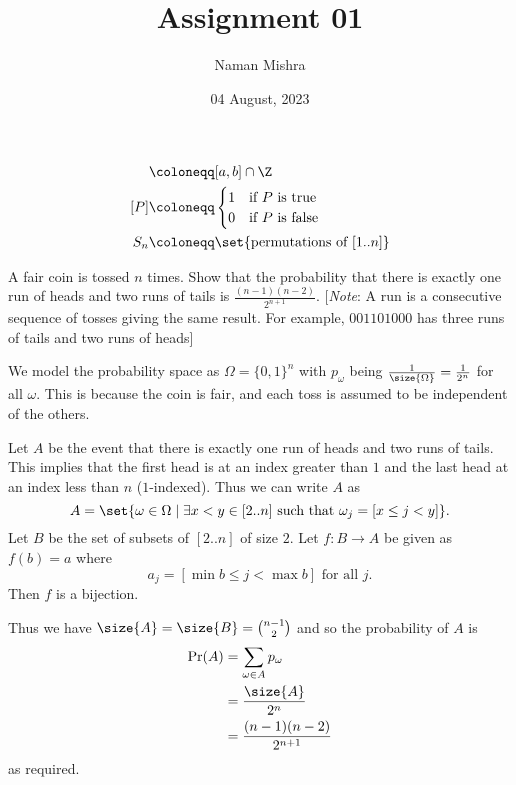 \documentclass[12pt]{article}
\title{Assignment 01}
\author{Naman Mishra}
\date{04 August, 2023}
\begin{document}
\maketitle

\begin{notation}
    \begin{align*}
        [a..b] &\coloneqq [a, b] \cap \Z \\
        [P] &\coloneqq \begin{cases}
            1 & \text{if $P$ is true} \\
            0 & \text{if $P$ is false}
        \end{cases} \\
        S_{n} &\coloneqq \set{\text{permutations of } [1..n]}
    \end{align*}
\end{notation}
\setcounter{section}{1}
\begin{problem}
    A fair coin is tossed $n$ times.
    Show that the probability that there is exactly one run of heads and two
    runs of tails is $\frac{(n - 1)(n - 2)}{2^{n + 1}}$.
    [\textit{Note}: A run is a consecutive sequence of tosses giving the same
    result.
    For example, $001101000$ has three runs of tails and two runs of heads]
\end{problem}
\begin{solution}
    We model the probability space as $\Omega = \{0, 1\}^n$ with $p_{\omega}$
    being $\frac{1}{\size{\Omega}} = \frac{1}{2^{n}}$ for all $\omega$.
    This is because the coin is fair, and each toss is assumed to be independent
    of the others.

    Let $A$ be the event that there is exactly one run of heads and two runs
    of tails.
    This implies that the first head is at an index greater than $1$ and the
    last head at an index less than $n$ ($1$-indexed).
    Thus we can write $A$ as \[
        A = \set{\omega \in \Omega \mid \exists x < y \in [2..n]
            \text{ such that } \omega_{j} = [x \leq j < y]}.
    \]
    Let $B$ be the set of subsets of $[2..n]$ of size $2$.
    Let $f : B \to A$ be given as $f(b) = a$ where \[
        a_{j} = [\min b \leq j < \max b] \text{ for all } j.
    \]
    Then $f$ is a bijection.

    Thus we have $\size{A} = \size{B} = \binom{n-1}{2}$ and so the probability
    of $A$ is \begin{align*}
        \Pr(A) &= \sum_{\omega \in A} p_{\omega} \\
            &= \frac{\size{A}}{2^{n}} \\
            &= \frac{(n - 1)(n - 2)}{2^{n + 1}}
    \end{align*} as required.
\end{solution}
\end{document}
